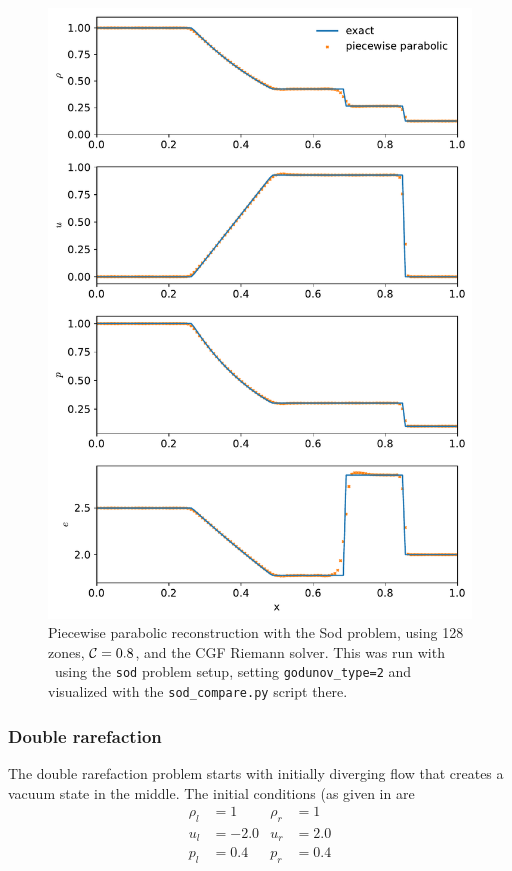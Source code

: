 \begin{figure}[t]
\centering
\includegraphics[width=0.7\linewidth]{hydro1d_ppm_sod}
\caption{\label{fig:Euler:sod:ppm} Piecewise parabolic reconstruction
  with the Sod problem, using 128 zones, ${\mathcal{C}} = 0.8$, and the CGF
  Riemann solver.  This was run with \hydrooned\ using the {\tt sod}
  problem setup, setting {\tt godunov\_type=2} and visualized with the
  {\tt sod\_compare.py} script there.}
\end{figure}


\subsubsection{Double rarefaction}

The double rarefaction problem starts with initially diverging flow
that creates a vacuum state in the middle.  The initial conditions (as
given in \cite{toro:1997} are
\begin{align}
\rho_l &= 1      &  \rho_r &= 1 \nonumber \\
u_l    &= -2.0   &  u_r    &= 2.0   \\
p_l    &= 0.4    &  p_r    &= 0.4 \nonumber
\end{align}


